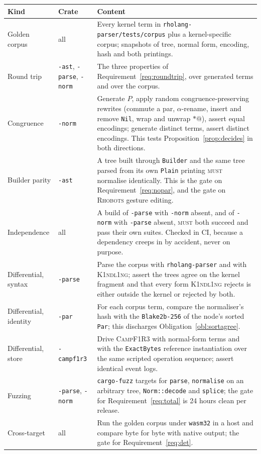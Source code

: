 \documentclass[11pt,a4paper]{article}
\newcommand{\code}[1]{\texttt{#1}}
\newcommand{\Kind}{\textsc{K1ndl1ng}}
\newcommand{\Camp}{\textsc{CampF1R3}}
\newcommand{\Rhobots}{\textsc{Rhobots}}
\newcommand{\MUST}{\textsc{must}}
\theoremstyle{definition}
\theoremstyle{plain}
\begin{document}
\begin{center}
\begin{tabularx}{\linewidth}{@{}ll>{\raggedright\arraybackslash}X@{}}
\toprule
Kind & Crate & Content\\
\midrule
Golden corpus & all & Every kernel term in \code{rholang-parser/tests/corpus}
plus a kernel-specific corpus; snapshots of tree, normal form, encoding, hash
and both printings.\\
Round trip & \code{-ast}, \code{-parse}, \code{-norm} & The three properties of
Requirement~\ref{req:roundtrip}, over generated terms and over the corpus.\\
Congruence & \code{-norm} & Generate $P$, apply random congruence-preserving
rewrites (commute a par, $\alpha$-rename, insert and remove \code{Nil}, wrap and
unwrap $*@$), assert equal encodings; generate distinct terms, assert distinct
encodings. This tests Proposition~\ref{prop:decides} in both directions.\\
Builder parity & \code{-ast} & A tree built through \code{Builder} and the same
tree parsed from its own \code{Plain} printing \MUST{} normalise identically.
This is the gate on Requirement~\ref{req:nopar}, and the gate on \Rhobots{}
gesture editing.\\
Independence & all & A build of \code{-parse} with \code{-norm} absent, and of
\code{-norm} with \code{-parse} absent, \MUST{} both succeed and pass their own
suites. Checked in CI, because a dependency creeps in by accident, never on
purpose.\\
Differential, syntax & \code{-parse} & Parse the corpus with
\code{rholang-parser} and with \Kind; assert the trees agree on the kernel
fragment and that every form \Kind{} rejects is either outside the kernel or
rejected by both.\\
Differential, identity & \code{-par} & For each corpus term, compare the
normaliser's hash with the \code{Blake2b-256} of the node's sorted \code{Par};
this discharges Obligation~\ref{obl:sortagree}.\\
Differential, store & \code{-campf1r3} & Drive \Camp{} with normal-form terms
and with the \code{ExactBytes} reference instantiation over the same scripted
operation sequence; assert identical event logs.\\
Fuzzing & \code{-parse}, \code{-norm} & \code{cargo-fuzz} targets for
\code{parse}, \code{normalise} on an arbitrary tree, \code{Norm::decode} and
\code{splice}; the gate for Requirement~\ref{req:total} is 24 hours clean per
release.\\
Cross-target & all & Run the golden corpus under \code{wasm32} in a host and
compare byte for byte with native output; the gate for
Requirement~\ref{req:det}.\\
\bottomrule
\end{tabularx}
\end{center}
\end{document}
